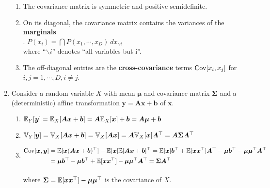 \begin{enumerate}[series=calcrulesrv]
\begin{enumerate}
        \item The covariance matrix is symmetric and positive semidefinite. 
        \hfill \cite{mfml/book/mml/Deisenroth-Faisal-Ong}
        
        \item On its diagonal, the covariance matrix contains the variances of the \textbf{marginals}
        \hfill \cite{mfml/book/mml/Deisenroth-Faisal-Ong}
        \\[0.2cm]
        .\hfill
        $
            P(x_i) = \dint P(x_1, \cdots , x_D )\ dx_{\backslash i}
        $
        \hfill \cite{mfml/book/mml/Deisenroth-Faisal-Ong}
        \\[0.2cm]
        where “$\backslash i$” denotes “all variables but i”. 
        \hfill \cite{mfml/book/mml/Deisenroth-Faisal-Ong}
        
        \item The off-diagonal entries are the \textbf{cross-covariance} terms $\text{Cov}[x_i, x_j ]$ for $i, j = 1, \cdots , D, i \neq j$.
        \hfill \cite{mfml/book/mml/Deisenroth-Faisal-Ong}
    \end{enumerate}

    \item Consider a random variable $X$ with mean $\bm{\mu}$ and covariance matrix $\bm{\Sigma}$ and a (deterministic) affine transformation $\bm{y} = \bm{Ax} + \bm{b}$ of $\bm{x}$. 
    \hfill \cite{mfml/book/mml/Deisenroth-Faisal-Ong}
    \begin{enumerate}
        \item 
        $ 
            \mathbb{E}_Y [\bm{y}] 
            = \mathbb{E}_X [\bm{Ax} + \bm{b}] 
            = \bm{A}\mathbb{E}_X [\bm{x}] + \bm{b} 
            = \bm{A\mu} + \bm{b} 
        $
        \hfill \cite{mfml/book/mml/Deisenroth-Faisal-Ong}

        \item 
        $
            \mathbb{V}_Y [\bm{y}] 
            = \mathbb{V}_X [\bm{Ax} + \bm{b}] 
            = \mathbb{V}_X [\bm{Ax}] 
            = \bm{A}\mathbb{V}_X [\bm{x}]\bm{A}^\top 
            = \bm{A\Sigma A}^\top
        $
        \hfill \cite{mfml/book/mml/Deisenroth-Faisal-Ong}

        \item 
        $
            \begin{aligned}
                \text{Cov}[\bm{x}, \bm{y}] 
                &= \mathbb{E}[\bm{x}(\bm{Ax} + \bm{b})^\top ] - \mathbb{E}[\bm{x}] \mathbb{E}[\bm{Ax} + \bm{b}]^\top  
                = \mathbb{E}[\bm{x}]\bm{b}^\top  + \mathbb{E}[\bm{xx}^\top ]\bm{A}^\top  - \bm{\mu b}^\top  - \bm{\mu \mu }^\top \bm{A}^\top  \\
                &= \bm{\mu b}^\top  - \bm{\mu b}^\top  + \mathbb{E}[\bm{xx}^\top ] - \bm{\mu \mu }^\top \bm{A}^\top 
                = \bm{\Sigma A}^\top 
            \end{aligned}
        $
        \hfill \cite{mfml/book/mml/Deisenroth-Faisal-Ong}
        \\[0.2cm]
        where $\bm{\Sigma} = \mathbb{E}[\bm{xx}^\top ] - \bm{\mu\mu}^\top $ is the covariance of $X$.
        \hfill \cite{mfml/book/mml/Deisenroth-Faisal-Ong}
    \end{enumerate}


\end{enumerate}
